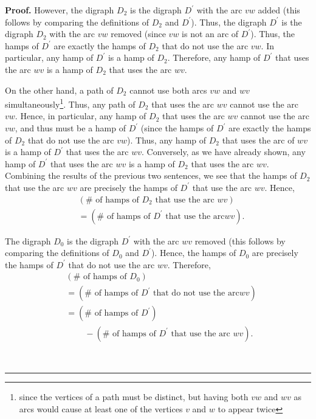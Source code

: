 \documentclass[numbers=enddot,12pt,final,onecolumn,notitlepage]{scrartcl}%
\numberwithin{exer}{subsection}
\theoremstyle{definition}
\newenvironment{proof}[1][Proof]{\noindent\textbf{#1.} }{\ \rule{0.5em}{0.5em}}
\begin{document}
\begin{proof}
However, the digraph $D_{2}$ is the digraph $D^{\prime}$ with the arc $vw$
added (this follows by comparing the definitions of $D_{2}$ and $D^{\prime}$).
Thus, the digraph $D^{\prime}$ is the digraph $D_{2}$ with the arc $vw$
removed (since $vw$ is not an arc of $D^{\prime}$). Thus, the hamps of
$D^{\prime}$ are exactly the hamps of $D_{2}$ that do not use the arc $vw$. In
particular, any hamp of $D^{\prime}$ is a hamp of $D_{2}$. Therefore, any hamp
of $D^{\prime}$ that uses the arc $wv$ is a hamp of $D_{2}$ that uses the arc
$wv$.

On the other hand, a path of $D_{2}$ cannot use both arcs $vw$ and $wv$
simultaneously\footnote{since the vertices of a path must be distinct, but
having both $vw$ and $wv$ as arcs would cause at least one of the vertices $v$
and $w$ to appear twice}. Thus, any path of $D_{2}$ that uses the arc $wv$
cannot use the arc $vw$. Hence, in particular, any hamp of $D_{2}$ that uses
the arc $wv$ cannot use the arc $vw$, and thus must be a hamp of $D^{\prime}$
(since the hamps of $D^{\prime}$ are exactly the hamps of $D_{2}$ that do not
use the arc $vw$). Thus, any hamp of $D_{2}$ that uses the arc of $wv$ is a
hamp of $D^{\prime}$ that uses the arc $wv$. Conversely, as we have already
shown, any hamp of $D^{\prime}$ that uses the arc $wv$ is a hamp of $D_{2}$
that uses the arc $wv$. Combining the results of the previous two sentences,
we see that the hamps of $D_{2}$ that use the arc $wv$ are precisely the hamps
of $D^{\prime}$ that use the arc $wv$. Hence,%
\begin{align}
&  \left(  \#\text{ of hamps of }D_{2}\text{ that use the arc }wv\right)
\nonumber\\
&  =\left(  \#\text{ of hamps of }D^{\prime}\text{ that use the arc
}wv\right)  . \label{pf.lem.tourn.reverse.eq2}%
\end{align}


The digraph $D_{0}$ is the digraph $D^{\prime}$ with the arc $wv$ removed
(this follows by comparing the definitions of $D_{0}$ and $D^{\prime}$).
Hence, the hamps of $D_{0}$ are precisely the hamps of $D^{\prime}$ that do
not use the arc $wv$. Therefore,%
\begin{align}
&  \left(  \#\text{ of hamps of }D_{0}\right) \nonumber\\
&  =\left(  \#\text{ of hamps of }D^{\prime}\text{ that do not use the arc
}wv\right) \nonumber\\
&  =\left(  \#\text{ of hamps of }D^{\prime}\right) \nonumber\\
&  \ \ \ \ \ \ \ \ \ \ -\left(  \#\text{ of hamps of }D^{\prime}\text{ that
use the arc }wv\right)  . \label{pf.lem.tourn.reverse.eq3}%
\end{align}



\end{proof}
\end{document}
